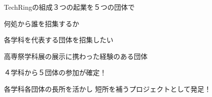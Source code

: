 \documentclass[dvipdfmx]{beamer}
\begin{document}
\begin{frame}{TechRingの組成}{３つの起業を５つの団体で}
  \begin{block}{何処から誰を招集するか}
    \vspace{2mm}
    \begin{description}
      \setlength{\itemsep}{2mm}
      \item[招集基準] 各学科を代表する団体を招集したい
      \item[判断素材] 高専祭学科展の展示に携わった経験のある団体
      \item[招集結果] ４学科から５団体の参加が確定！
    \end{description}
  \end{block}

  \begin{center}
  \end{center}

  \begin{Large}
    各学科各団体の\alert{長所を活かし} \vfill \hspace{5em}\alert{短所を補う}プロジェクトとして発足！
  \end{Large}
\end{frame}
\end{document}
